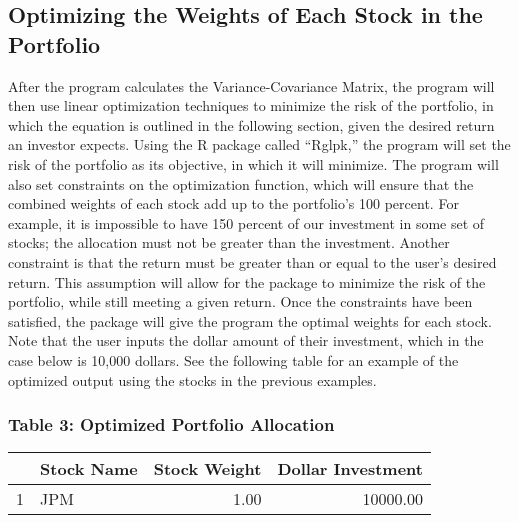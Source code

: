 \documentclass[12pt,english]{article}
\begin{document}
\begin{doublespace}
        \subsection{Optimizing the Weights of Each Stock in the Portfolio}
        
            \indent{}\indent{}
            After the program calculates the Variance-Covariance Matrix, the program will then use linear optimization techniques to minimize the risk of the portfolio, in which the equation is outlined in the following section, given the desired return an investor expects. Using the R package called “Rglpk,” the program will set the risk of the portfolio as its objective, in which it will minimize. The program will also set constraints on the optimization function, which will ensure that the combined weights of each stock add up to the portfolio’s 100 percent. For example, it is impossible to have 150 percent of our investment in some set of stocks; the allocation must not be greater than the investment. Another constraint is that the return must be greater than or equal to the user’s desired return. This assumption will allow for the package to minimize the risk of the portfolio, while still meeting a given return. Once the constraints have been satisfied, the package will give the program the optimal weights for each stock. Note that the user inputs the dollar amount of their investment, which in the case below is 10,000 dollars. See the following table for an example of the optimized output using the stocks in the previous examples.
            
            \subsubsection{Table 3: Optimized Portfolio Allocation}
                \begin{table}[ht]
                \centering
                \begin{tabular}{rlrr}
                  \hline
                 & Stock Name & Stock Weight & Dollar Investment \\ 
                  \hline
                1 & JPM & 1.00 & 10000.00 \\ 
                   \hline
                \end{tabular}
                \end{table}
                

\end{doublespace}
\end{document}
